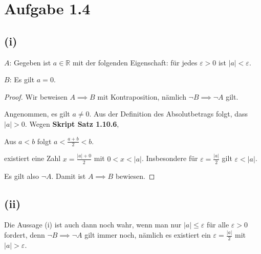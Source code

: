 \documentclass[12pt]{extarticle}
\begin{document}
\section*{Aufgabe 1.4}
\subsection*{(i)}
\(A\): Gegeben ist \(a \in \mathbb{R}\) mit der folgenden Eigenschaft: für
jedes \(\varepsilon > 0\) ist \(|a| < \varepsilon\).

\(B\): Es gilt \(a = 0\).
\begin{proof}
Wir beweisen \(A \implies B\) mit Kontraposition, nämlich $\neg B
\implies \neg A$ gilt.

Angenommen, es gilt \(a \neq 0\).  Aus der Definition des Absolutbetrags
folgt, dass \(|a| > 0\).  Wegen \textbf{Skript Satz 1.10.6},
\begin{center}
  Aus \(a < b\) folgt \(a < \frac{a+b}{2} < b\).
\end{center}

existiert eine Zahl \(x = \frac{|a|+0}{2}\) mit
\(0 < x < |a|\).  Insbesondere für \(\varepsilon = \frac{|a|}{2}\) gilt
\(\varepsilon < |a|\).

Es gilt also \(\neg A\).  Damit ist \(A \implies B\) bewiesen.
\end{proof}

\subsection*{(ii)}

Die Aussage (i) ist auch dann noch wahr, wenn man nur
\(|a| \leq \varepsilon\) für alle \(\varepsilon > 0\) fordert, denn
\(\neg B \implies \neg A\) gilt immer noch, nämlich es existiert ein
\(\varepsilon = \frac{|a|}{2}\) mit \(|a| > \varepsilon\).
\end{document}
